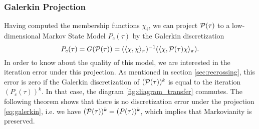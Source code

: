 \subsubsection*{Galerkin Projection}
Having computed the membership functions $\chi_i$, we can project $\mathcal{P}(\tau)$ to a low-dimensional Markov State Model $P_c(\tau)$
by the Galerkin discretization
\begin{equation}
\label{eq:galerkin}
P_c(\tau) = G(\mathcal{P}(\tau)) = (\langle \chi, \chi \rangle_\pi)^{-1} (\langle \chi, \mathcal{P}(\tau) \chi \rangle_\pi).
\end{equation}
In order to know about the quality of this model, we are interested in the iteration error under this projection. As mentioned in section \ref{sec:recrossing}, this error is zero if the Galerkin discretization of $(\mathcal{P}(\tau))^k$ is equal to the iteration $(P_c(\tau))^k$. In that case, the diagram \ref{fig:diagram_transfer} commutes.
The following theorem shows that there is no discretization error under the projection \eqref{eq:galerkin}, i.e.  we have $(\mathcal{P}(\tau))^k = (P(\tau))^k$, which implies that Markovianity is preserved. 

